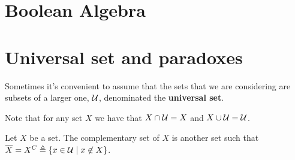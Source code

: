 \section{Boolean Algebra}

\section{Universal set and paradoxes}

Sometimes it's convenient to assume that the sets that we are considering are subsets of a larger one, $\mathcal{U}$, denominated
the \textbf{universal set}.

\begin{remark}
    Note that for any set $X$ we have that $X\cap\mathcal{U} = X$ and $X\cup\mathcal{U} = \mathcal{U}$.
\end{remark}

\begin{defn}
    Let $X$ be a set. The complementary set of $X$ is another set such that $\overline{X} = {X}^C\triangleq\{ x\in\mathcal{U}\; | \;
    x\not\in X \}$.
\end{defn}






